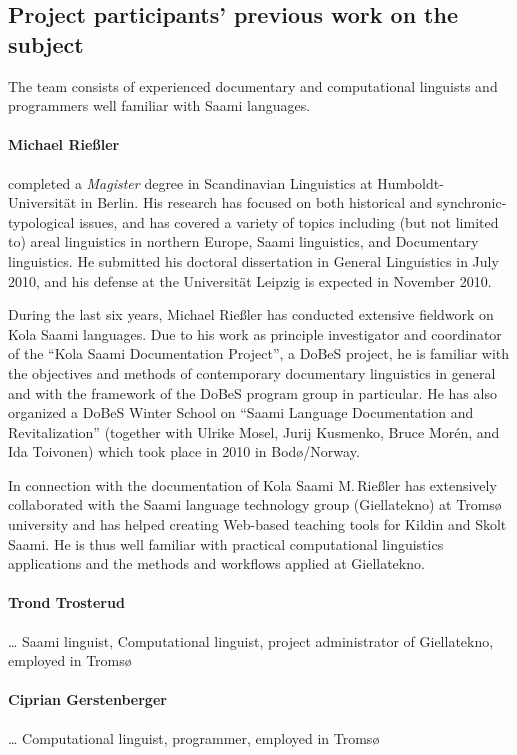 \documentclass[a4paper,12pt]{article}
\begin{document}
{{{{\subsection{Project participants' previous work on the subject}
The team consists of experienced documentary and computational linguists and programmers well familiar with Saami languages.

\paragraph{Michael Rießler} completed a \textit{Magister} degree in Scandinavian Linguistics at Humboldt-Universität in Berlin. His research has focused on both historical and synchronic-typological issues, and has covered a variety of topics including (but not limited to) areal linguistics in northern Europe, Saami linguistics, and Documentary linguistics. He submitted his doctoral dissertation in General Linguistics in July 2010, and his defense at the Universität Leipzig is expected in November 2010.

During the last six years, Michael Rießler has conducted extensive fieldwork on Kola Saami languages. Due to his work as principle investigator and coordinator of the “Kola Saami Documentation Project”, a DoBeS project, he is familiar with the objectives and methods of contemporary documentary linguistics in general and with the framework of the DoBeS program group in particular. He has also organized a DoBeS Winter School on “Saami Language Documentation and Revitalization” (together with Ulrike Mosel, Jurij Kusmenko, Bruce Morén, and Ida Toivonen) which took place in 2010 in Bodø/Norway.

In connection with the documentation of Kola Saami M.\,Rießler has extensively collaborated with the Saami language technology group (Giellatekno) at Tromsø university and has helped creating Web-based teaching tools for Kildin and Skolt Saami. He is thus well familiar with practical computational linguistics applications and the methods and workflows applied at Giellatekno.

\paragraph{Trond Trosterud} … Saami linguist, Computational linguist, project administrator of Giellatekno, employed in Tromsø

\paragraph{Ciprian Gerstenberger} … Computational linguist, programmer, employed in Tromsø

}}}}
\end{document}
